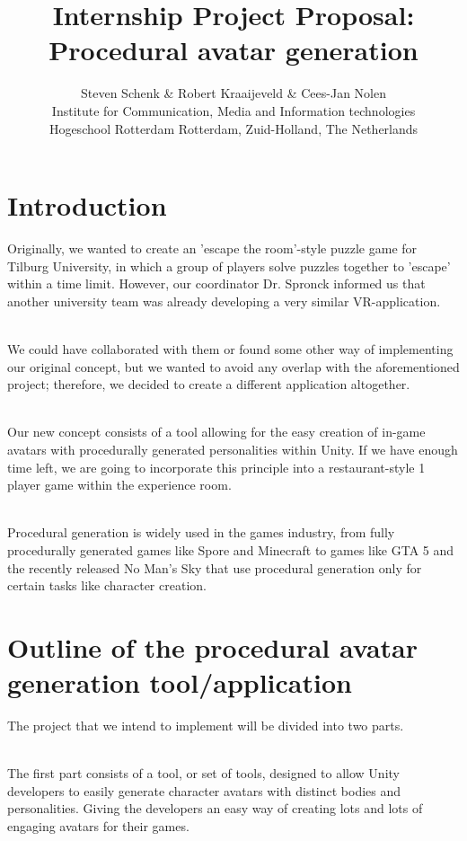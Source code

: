 \documentclass[11pt]{article}
\title{\Huge Internship Project Proposal: Procedural avatar generation}
\author{Steven Schenk \& Robert Kraaijeveld \& Cees-Jan Nolen\\
	Institute for Communication, Media and Information technologies\\
	Hogeschool Rotterdam
	Rotterdam, Zuid-Holland, The Netherlands \\
	}
\begin{document}
\nocite{*}
\maketitle
{}
\rhead{}
\lfoot{}
\cfoot{}

\newpage
\tableofcontents
\pagebreak

\newpage
{}
{}
\section*{Introduction}
Originally, we wanted to create an 'escape the room'-style puzzle game for Tilburg University, in which a group of players solve puzzles together to 'escape' within a time limit. However, our coordinator Dr. Spronck informed us that another university team was already developing a very similar VR-application.

~\\
We could have collaborated with them or found some other way of implementing our original concept, but we wanted to avoid any overlap with the aforementioned project; therefore, we decided to create a different application altogether.

~\\
Our new concept consists of a tool allowing for the easy creation of in-game avatars with procedurally generated personalities within Unity. If we have enough time left, we are going to incorporate this principle into a restaurant-style 1 player game within the experience room.

~\\
Procedural generation is widely used in the games industry, from fully procedurally generated games like Spore and Minecraft to games like GTA 5 and the recently released No Man's Sky that use procedural generation only for certain tasks like character creation.


\newpage
{}
{}
\section*{Outline of the procedural avatar generation tool/application}
The project that we intend to implement will be divided into two parts. 

~\\
The first part consists of a tool, or set of tools, designed to allow Unity developers to easily generate character avatars with distinct bodies and personalities. Giving the developers an easy way of creating lots and lots of engaging avatars for their games.
\end{document}
